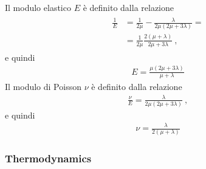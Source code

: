 \documentclass[letterpaper,10pt,english]{jupyterBook}
\begin{document}
\sphinxAtStartPar
{} Il modulo elastico \(E\) è definito dalla relazione
\begin{equation*}
\begin{split}\begin{aligned}
  \frac{1}{E} 
  & = \frac{1}{2 \mu} - \frac{\lambda}{2 \mu (2 \mu + 3 \lambda)} = \\
  & = \frac{1}{2 \mu} \frac{2 (\mu + \lambda)}{2 \mu + 3 \lambda} \ ,
\end{aligned}\end{split}
\end{equation*}
\sphinxAtStartPar
e quindi
\begin{equation*}
\begin{split}E = \frac{\mu (2 \mu + 3 \lambda)}{\mu + \lambda}\end{split}
\end{equation*}
\sphinxAtStartPar
{} Il modulo di Poisson \(\nu\) è definito dalla relazione
\begin{equation*}
\begin{split}\frac{\nu}{E} = \frac{\lambda}{2\mu (2 \mu + 3 \lambda)} \ ,\end{split}
\end{equation*}
\sphinxAtStartPar
e quindi
\begin{equation*}
\begin{split}\nu = \frac{\lambda}{2 (\mu + \lambda)}\end{split}
\end{equation*}\subsubsection*{Thermodynamics}
\end{document}
